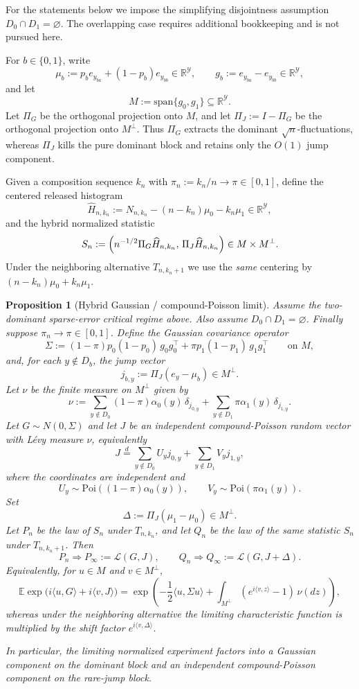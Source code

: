 \documentclass{article}
\newtheorem{proposition}[theorem]{Proposition}
\begin{document}
For the statements below we impose the simplifying disjointness assumption $D_0\cap D_1=\varnothing$. The overlapping case requires additional bookkeeping and is not pursued here.

For $b\in\{0,1\}$, write
\[
\mu_b:=p_b e_{y_{ba}}+(1-p_b)e_{y_{bb}}\in \mathbb R^{\mathcal Y},
\qquad
g_b:=e_{y_{ba}}-e_{y_{bb}}\in \mathbb R^{\mathcal Y},
\]
and let
\[
M:=\mathrm{span}\{g_0,g_1\}\subseteq \mathbb R^{\mathcal Y}.
\]
Let $\Pi_G$ be the orthogonal projection onto $M$, and let $\Pi_J:=I-\Pi_G$ be the orthogonal projection
onto $M^\perp$. Thus $\Pi_G$ extracts the dominant $\sqrt n$-fluctuations, whereas $\Pi_J$ kills the
pure dominant block and retains only the $O(1)$ jump component.

Given a composition sequence $k_n$ with $\pi_n:=k_n/n\to\pi\in[0,1]$, define the centered released histogram
\[
\widehat H_{n,k_n}:=N_{n,k_n}-(n-k_n)\mu_0-k_n\mu_1\in \mathbb R^{\mathcal Y},
\]
and the hybrid normalized statistic
\[
S_n:=\Bigl(n^{-1/2}\Pi_G\widehat H_{n,k_n},\, \Pi_J\widehat H_{n,k_n}\Bigr)
\in M\times M^\perp.
\]
Under the neighboring alternative $T_{n,k_n+1}$ we use the \emph{same} centering by $(n-k_n)\mu_0+k_n\mu_1$.

\begin{proposition}[Hybrid Gaussian / compound-Poisson limit]
\label{prop:hybrid-gaussian-compound-poisson}
Assume the two-dominant sparse-error critical regime above. Also assume
$D_0\cap D_1=\varnothing$. Finally suppose $\pi_n\to\pi\in[0,1]$. Define the Gaussian
covariance operator
\[
\Sigma:=(1-\pi)p_0(1-p_0)\,g_0g_0^{\top}+\pi p_1(1-p_1)\,g_1g_1^{\top}
\qquad \text{on } M,
\]
and, for each $y\notin D_b$, the jump vector
\[
j_{b,y}:=\Pi_J(e_y-\mu_b)\in M^\perp.
\]
Let $\nu$ be the finite measure on $M^\perp$ given by
\[
\nu
:=\sum_{y\notin D_0}(1-\pi)\alpha_0(y)\,\delta_{j_{0,y}}
 +\sum_{y\notin D_1}\pi\alpha_1(y)\,\delta_{j_{1,y}}.
\]
Let $G\sim N(0,\Sigma)$ and let $J$ be an independent compound-Poisson random vector with L\'evy measure
$\nu$, equivalently
\[
J\overset{d}=\sum_{y\notin D_0}U_y j_{0,y}+\sum_{y\notin D_1}V_y j_{1,y},
\]
where the coordinates are independent and
\[
U_y\sim \mathrm{Poi}((1-\pi)\alpha_0(y)),
\qquad
V_y\sim \mathrm{Poi}(\pi\alpha_1(y)).
\]
Set
\[
\Delta:=\Pi_J(\mu_1-\mu_0)\in M^\perp.
\]
Let $P_n$ be the law of $S_n$ under $T_{n,k_n}$, and let $Q_n$ be the law of the same statistic $S_n$
under $T_{n,k_n+1}$. Then
\[
P_n\Longrightarrow P_\infty:=\mathcal L(G,J),
\qquad
Q_n\Longrightarrow Q_\infty:=\mathcal L(G,J+\Delta).
\]
Equivalently, for $u\in M$ and $v\in M^\perp$,
\[
\mathbb E\exp\bigl(i\langle u,G\rangle+i\langle v,J\rangle\bigr)
=\exp\!\left(-\frac12\langle u,\Sigma u\rangle
+\int_{M^\perp}(e^{i\langle v,z\rangle}-1)\,\nu(dz)\right),
\]
whereas under the neighboring alternative the limiting characteristic function is multiplied by the shift factor
$e^{i\langle v,\Delta\rangle}$.

In particular, the limiting normalized experiment factors into a Gaussian component on the dominant block and an
independent compound-Poisson component on the rare-jump block.
\end{proposition}
\end{document}

